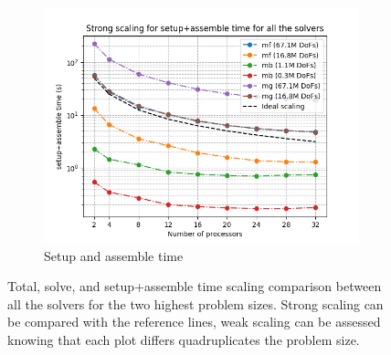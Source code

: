 \begin{figure}[h!]
\begin{subfigure}[h]{0.5\textwidth}
         \centering
         \includegraphics[width=\textwidth]{figure/strongcomp_setup+assemble.png}
         \caption{Setup and assemble time}
     \end{subfigure}
     \caption{Total, solve, and setup+assemble time scaling comparison between all the solvers for the two highest problem sizes. Strong scaling can be compared with the reference lines, weak scaling can be assessed knowing that each plot differs quadruplicates the problem size.}
     \label{fig:strongcomp}
\end{figure}
